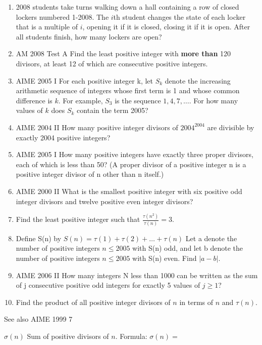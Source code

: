 \documentclass{article}
\begin{document}
\begin{enumerate}
\item 2008 students take turns walking down a hall containing a row of closed lockers numbered 1-2008. The $i$th student changes the state of each locker that is a multiple of $i$, opening it if it is closed, closing it if it is open. After all students finish, how many lockers are open?
\item AM 2008 Test A Find the least positive integer with \textbf{more than} 120 divisors, at least 12 of which are consecutive positive integers.
\item AIME 2005 I For each positive integer k, let $S_k$ denote the increasing arithmetic sequence of integers whose first term is 1 and whose common difference is $k$. For example,
$S_3$ is the sequence $1, 4, 7, \ldots$. For how many values of $k$ does $S_k$ contain the
term 2005?
\item AIME 2004 II How many positive integer divisors of $2004^{2004}$ are divisible by exactly 2004 positive integers?
\item AIME 2005 I How many positive integers have exactly three proper divisors, each of which
is less than 50? (A proper divisor of a positive integer n is a positive integer
divisor of n other than n itself.)
\item AIME 2000 II What is the smallest positive integer with six positive odd integer divisors and twelve positive even integer divisors?
\item Find the least positive integer such that $\frac{\tau (n^2)}{\tau (n)}=3$. 
\item Define S(n) by
$S(n) =  \tau (1) + \tau (2) + \ldots + \tau (n)$
Let a denote the number of positive integers $n \leq 2005$ with S(n) odd, and let b
denote the number of positive integers $n \leq 2005$ with S(n) even. Find $|a - b|$. 
\item AIME 2006 II How many integers N less than 1000 can be written as the sum of j consecutive positive odd integers for exactly 5 values of $j \geq 1$?
\item Find the product of all positive integer divisors of $n$ in terms of $n$ and $\tau (n)$. 
\end{enumerate}
See also AIME 1999 7
\newline

$\sigma (n)$ Sum of positive divisors of $n$.
\newline
Formula: $\sigma (n)=$
\newline
\newline
\end{document}
